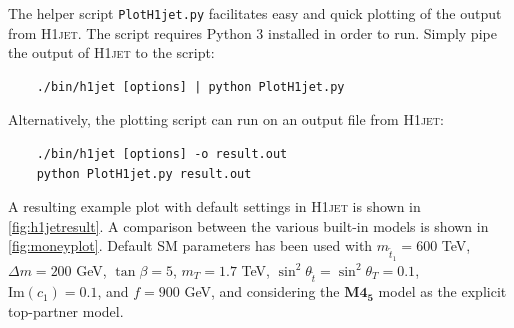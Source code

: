 \documentclass[12pt]{article}
\begin{document}
The helper script \texttt{PlotH1jet.py} facilitates easy and
quick plotting of the output from \textsc{H1jet}. The script requires
Python 3 installed in order to run. Simply pipe the output of \textsc{H1jet} to the script:
\begin{lstlisting}
	./bin/h1jet [options] | python PlotH1jet.py 
\end{lstlisting}
Alternatively, the plotting script can run on an output file from \textsc{H1jet}: 
\begin{lstlisting}
	./bin/h1jet [options] -o result.out 
	python PlotH1jet.py result.out 
\end{lstlisting}
A resulting example plot with default settings in \textsc{H1jet} is shown in \autoref{fig:h1jetresult}. A comparison between the various built-in models is shown in \autoref{fig:moneyplot}. Default SM parameters has been used with $m_{\tilde{t}_1} = 600$ TeV, $\Delta m = 200$ GeV, $\tan\beta = 5$, $m_T = 1.7$ TeV, $\sin^2\theta_{\tilde{t}} = \sin^2\theta_{T} = 0.1$, $\text{Im}(c_1) = 0.1$, and $f = 900$ GeV, and considering the $\textbf{M4}_{\textbf{5}}$ model as the explicit top-partner model. 

\end{document}
